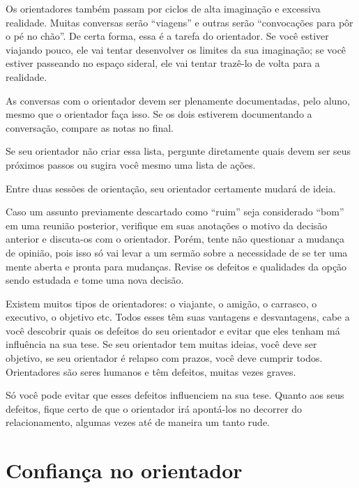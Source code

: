 Os orientadores também passam por ciclos de alta imaginação e excessiva realidade. Muitas conversas serão ``viagens'' e outras serão ``convocações para pôr o pé no chão''. De certa forma, essa é a tarefa do orientador. Se você estiver viajando pouco, ele vai tentar desenvolver os limites da sua imaginação; se você estiver passeando no espaço sideral, ele vai tentar trazê-lo de volta para a realidade.


As conversas com o orientador devem ser plenamente documentadas, pelo aluno, mesmo que o orientador faça isso. Se os dois estiverem documentando a conversação, compare as notas no final. 




Se seu orientador não criar essa lista, pergunte diretamente quais devem ser seus próximos passos ou sugira você mesmo uma lista de ações. 


Entre duas sessões de orientação, seu orientador certamente mudará de ideia. 




Caso um assunto previamente descartado como ``ruim'' seja considerado ``bom'' em uma reunião posterior, verifique em suas anotações o motivo da decisão anterior e discuta-os com o orientador. Porém, tente não questionar a mudança de opinião, pois isso só vai levar a um sermão sobre a necessidade de se ter uma mente aberta e pronta para mudanças. Revise os defeitos e qualidades da opção sendo estudada e tome uma nova decisão.


Existem muitos tipos de orientadores: o viajante, o amigão, o carrasco, o executivo, o objetivo etc. Todos esses têm suas vantagens e desvantagens, cabe a você descobrir quais os defeitos do seu orientador e evitar que eles tenham má influência na sua tese. Se seu orientador tem muitas ideias, você deve ser objetivo, se seu orientador é relapso com prazos, você deve cumprir todos. Orientadores são seres humanos e têm defeitos, muitas vezes graves. 


Só você pode evitar que esses defeitos influenciem na sua tese. Quanto aos seus defeitos, fique certo de que o orientador irá apontá-los no decorrer do relacionamento, algumas vezes até de maneira um tanto rude.


\section{Confiança no orientador}



